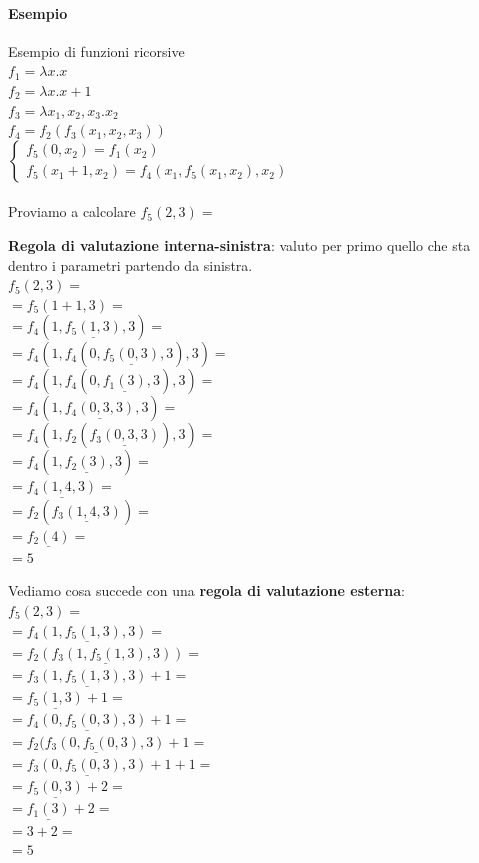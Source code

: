 \documentclass[10pt]{book}
\begin{document}
\paragraph{Esempio} Esempio di funzioni ricorsive\\
$f_1 = \lambda x.x$\\
$f_2 = \lambda x.x+1$\\
$f_3 = \lambda x_1, x_2, x_3. x_2$\\
$f_4 = f_2(f_3(x_1, x_2, x_3))$\\
\begin{math}
		\left\{
		\begin{array}{l}
			f_5(0, x_2) = f_1(x_2)\\
			f_5(x_1 + 1, x_2) = f_4(x_1, f_5(x_1, x_2), x_2)
		\end{array}
		\right.
\end{math}\\\\
Proviamo a calcolare $f_5(2, 3) =$
\begin{multicols}{2}
\textbf{Regola di valutazione interna-sinistra}: valuto per primo quello che sta dentro i parametri partendo da sinistra.\\
$f_5(2, 3) =$\\
$= f_5(1 + 1, 3) =$\\
$= f_4(1, \underline{f_5(1, 3)}, 3) =$\\
$= f_4(1, f_4(0, \underline{f_5(0, 3)}, 3), 3) =$\\$= f_4(1, f_4(0, \underline{f_1(3)}, 3), 3) =$\\
$= f_4(1,\underline{f_4(0, 3, 3)}, 3) =$\\
$= f_4(1, f_2(\underline{f_3(0, 3, 3)}), 3) =$\\
$= f_4(1, \underline{f_2(3)}, 3) =$\\
$= \underline{f_4(1, 4, 3)} =$\\
$= f_2(\underline{f_3(1, 4, 3)}) = $\\
$= \underline{f_2(4)} =$\\
$= 5$\\
\columnbreak

Vediamo cosa succede con una \textbf{regola di valutazione esterna}:\\
$f_5(2, 3) =$\\
$= \underline{f_4( 1, f_5(1, 3), 3)} =$\\
$= \underline{f_2(f_3(1, f_5(1, 3), 3))} =$\\
$= \underline{f_3(1, f_5(1, 3), 3)} + 1 =$\\
$= \underline{f_5(1, 3)} + 1 =$\\
$= \underline{f_4(0, f_5(0, 3), 3)} + 1 =$\\
$= \underline{f_2(f_3(0, f_5(0, 3), 3)} + 1 = $\\
$= \underline{f_3(0, f_5(0, 3), 3)} + 1 + 1 =$\\
$= \underline{f_5(0, 3)} + 2 =$\\
$= \underline{f_1(3)} + 2 =$\\
$= 3 + 2 =$\\
$= 5$
\end{multicols}
\end{document}
